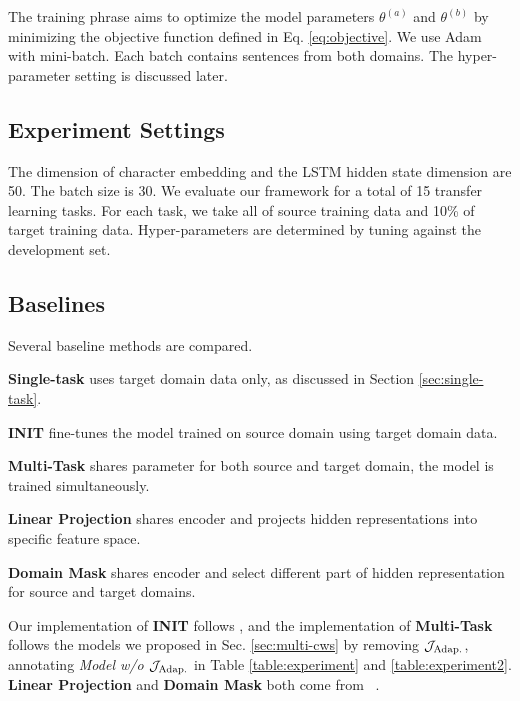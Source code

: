 The training phrase aims to optimize the model parameters $\theta^{(a)}$ and $\theta^{(b)}$ by minimizing the objective function defined in Eq. \eqref{eq:objective}. We use Adam ~\cite{DBLP:journals/corr/KingmaB14} with mini-batch. Each batch contains sentences from both domains. The hyper-parameter setting is discussed later.

\subsection{Experiment Settings}

The dimension of character embedding and the LSTM hidden state dimension are 50. The batch size is 30. We evaluate our framework for a total of 15 transfer 
learning tasks. For each task, we take all of source training data and 
10\% of target training data. Hyper-parameters are determined by tuning 
against the development set.

\subsection{Baselines}

Several baseline methods are compared.

\noindent \textbf{Single-task} uses target domain data only, as discussed in Section \ref{sec:single-task}.

\noindent \textbf{INIT} fine-tunes the model trained on source domain using target domain data.

\noindent \textbf{Multi-Task} shares parameter for both source and target domain, the model is trained simultaneously.

\noindent \textbf{Linear Projection} shares encoder and projects hidden representations into specific feature space.

\noindent \textbf{Domain Mask} shares encoder and select different part of hidden representation for source and target domains.

\noindent Our implementation of \textbf{INIT} follows , and the implementation of \textbf{Multi-Task} follows the models we proposed in Sec. \ref{sec:multi-cws} by removing $\mathcal{J}_\textnormal{Adap.}$, annotating \textit{Model w/o $\mathcal{J}_\textnormal{Adap.}$} in Table \ref{table:experiment} and \ref{table:experiment2}. \textbf{Linear Projection} and \textbf{Domain Mask} both come from ~\cite{DBLP:journals/corr/PengD16a}.


